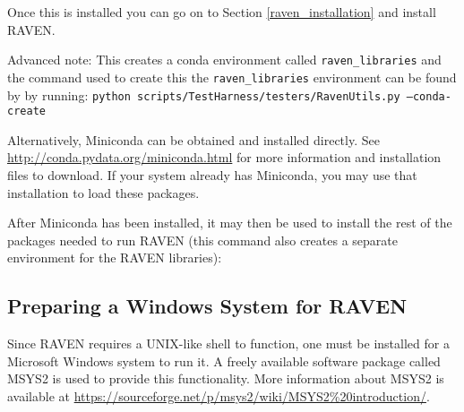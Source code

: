 
Once this is installed you can go on to Section \ref{raven_installation} and install RAVEN.

Advanced note: This creates a conda environment called
\texttt{raven\_libraries} and the command used to create this the \texttt{raven\_libraries} environment can be found by by running:
\texttt{python scripts/TestHarness/testers/RavenUtils.py --conda-create}

\label{miniconda_direct}

Alternatively, Miniconda can be obtained and installed directly. See
\url{http://conda.pydata.org/miniconda.html} for more information and
installation files to download.  If your system already has Miniconda,
you may use that installation to load these packages.

After Miniconda has been installed, it may then be used to install the
rest of the packages needed to run RAVEN (this command also creates a
separate environment for the RAVEN libraries):



\subsection{Preparing a Windows System for RAVEN}
\label{sysprep_windows}

Since RAVEN requires a UNIX-like shell to function, one must be installed for a Microsoft
Windows system to run it.  A freely available software package called MSYS2 is used to
provide this functionality.  More information about MSYS2 is available at
\url{https://sourceforge.net/p/msys2/wiki/MSYS2%20introduction/}.

